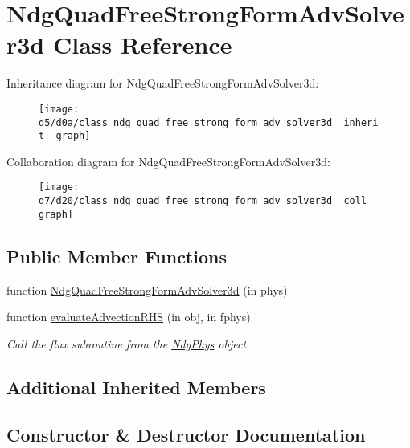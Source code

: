 \hypertarget{class_ndg_quad_free_strong_form_adv_solver3d}{}\section{Ndg\+Quad\+Free\+Strong\+Form\+Adv\+Solver3d Class Reference}
\label{class_ndg_quad_free_strong_form_adv_solver3d}


Inheritance diagram for Ndg\+Quad\+Free\+Strong\+Form\+Adv\+Solver3d\+:
\nopagebreak
\begin{figure}[H]
\begin{center}
\leavevmode
\texttt{[image: d5/d0a/class\_ndg\_quad\_free\_strong\_form\_adv\_solver3d\_\_inherit\_\_graph]}
\end{center}
\end{figure}


Collaboration diagram for Ndg\+Quad\+Free\+Strong\+Form\+Adv\+Solver3d\+:
\nopagebreak
\begin{figure}[H]
\begin{center}
\leavevmode
\texttt{[image: d7/d20/class\_ndg\_quad\_free\_strong\_form\_adv\_solver3d\_\_coll\_\_graph]}
\end{center}
\end{figure}
\subsection*{Public Member Functions}
\begin{DoxyCompactItemize}
\item 
function \hyperlink{class_ndg_quad_free_strong_form_adv_solver3d_a0c085a98e2339dba19e5ced5b7babd65}{Ndg\+Quad\+Free\+Strong\+Form\+Adv\+Solver3d} (in phys)
\item 
function \hyperlink{class_ndg_quad_free_strong_form_adv_solver3d_adff61327a546b816a1db3a7c8b04f90b}{evaluate\+Advection\+R\+HS} (in obj, in fphys)
\begin{DoxyCompactList}\small\item\em Call the flux subroutine from the \hyperlink{class_ndg_phys}{Ndg\+Phys} object. \end{DoxyCompactList}\end{DoxyCompactItemize}
\subsection*{Additional Inherited Members}


\subsection{Constructor \& Destructor Documentation}
\mbox{\label{class_ndg_quad_free_strong_form_adv_solver3d_a0c085a98e2339dba19e5ced5b7babd65}} 
